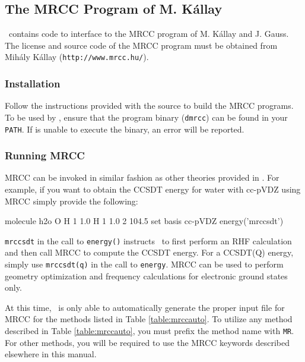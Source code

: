 \subsection{The MRCC Program of M. K\'{a}llay} \label{sec:mrcc}
\PSIfour\ contains code to interface to the MRCC program of M. K\'{a}llay
and J. Gauss.  The license and source code of the MRCC program must be
obtained from Mih\'{a}ly K\'{a}llay ({\tt http://www.mrcc.hu/}).

\renewcommand{\optionname}[2]{\texttt{\nameref{op-#2-#1}}}

\subsubsection{Installation}
Follow the instructions provided with the source to build the MRCC programs.
To be used by \PSIfour, ensure that the program binary ({\tt dmrcc}) can be
found in your {\tt PATH}. If \PSIfour is unable to execute the binary, an
error will be reported.

\subsubsection{Running MRCC}
MRCC can be invoked in similar fashion as other theories provided in \PSIfour.
For example, if you want to obtain the CCSDT energy for water with cc-pVDZ using
MRCC simply provide the following:
\begin{Snippet}
molecule h2o {
    O
    H 1 1.0
    H 1 1.0 2 104.5
}
set {
    basis cc-pVDZ
}
energy('mrccsdt')
\end{Snippet}

{\tt mrccsdt} in the call to {\tt energy()} instructs \PSIfour\ to first
perform an RHF calculation and then call MRCC to compute the CCSDT energy.
For a CCSDT(Q) energy, simply use {\tt mrccsdt(q)} in the call to
{\tt energy}. MRCC can be used to perform geometry optimization and
frequency calculations for electronic ground states only.

At this time, \PSIfour\ is only able to automatically generate the proper
input file for MRCC for the methods listed in Table \ref{table:mrccauto}.
To utilize any method described in Table \ref{table:mrccauto}, you must prefix
the method name with {\tt MR}. For other methods, you will be required to
use the MRCC keywords described elsewhere in this manual.

